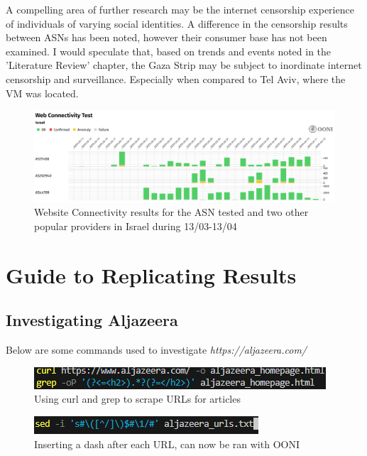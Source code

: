 A compelling area of further research may be the internet censorship experience of individuals of varying social identities. A difference in the censorship results between ASNs has been noted, however their consumer base has not been examined. I would speculate that, based on trends and events noted in the 'Literature Review' chapter, the Gaza Strip may be subject to inordinate internet censorship and surveillance. Especially when compared to Tel Aviv, where the VM was located.


\begin{figure} [H]
    \centering
    \includegraphics[width=1\linewidth]{ISRWEBASNcomp.png}
    \caption{Website Connectivity results for the ASN tested and two other popular providers in Israel during 13/03-13/04}
    \label{fig:enter-label}
\end{figure}


\section{Guide to Replicating Results}

\subsection{Investigating Aljazeera}
Below are some commands used to investigate \textit{https://aljazeera.com/}

\begin{figure} [H]
    \centering
    \includegraphics[width=1\linewidth]{AljazeeraURLs1.png}
    \caption{Using curl and grep to scrape URLs for articles}
    \label{fig:enter-label}
\end{figure}

\begin{figure} [H]
    \centering
\includegraphics[width=1\linewidth]{AljazeeraComs2.png}
    \caption{Inserting a dash after each URL, can now be ran with OONI}
    \label{fig:enter-label}
\end{figure}


